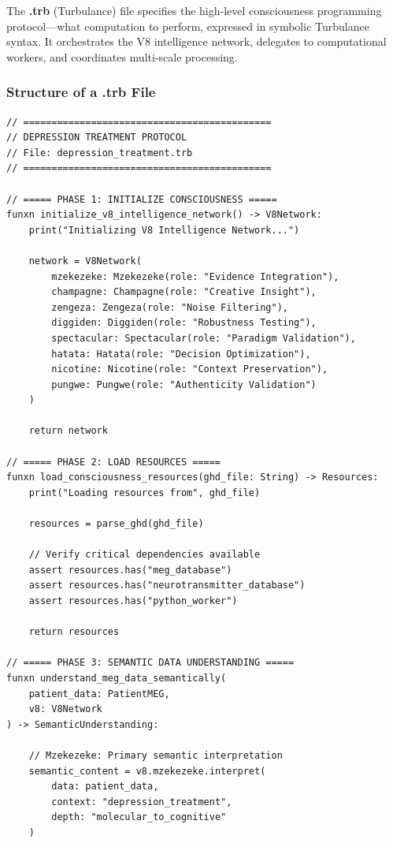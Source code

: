 \begin{definition}
The \textbf{.trb} (Turbulance) file specifies the high-level consciousness programming protocol—what computation to perform, expressed in symbolic Turbulance syntax. It orchestrates the V8 intelligence network, delegates to computational workers, and coordinates multi-scale processing.
\end{definition}

\subsubsection{Structure of a .trb File}

\begin{verbatim}
// ============================================
// DEPRESSION TREATMENT PROTOCOL
// File: depression_treatment.trb
// ============================================

// ===== PHASE 1: INITIALIZE CONSCIOUSNESS =====
funxn initialize_v8_intelligence_network() -> V8Network:
    print("Initializing V8 Intelligence Network...")
    
    network = V8Network(
        mzekezeke: Mzekezeke(role: "Evidence Integration"),
        champagne: Champagne(role: "Creative Insight"),
        zengeza: Zengeza(role: "Noise Filtering"),
        diggiden: Diggiden(role: "Robustness Testing"),
        spectacular: Spectacular(role: "Paradigm Validation"),
        hatata: Hatata(role: "Decision Optimization"),
        nicotine: Nicotine(role: "Context Preservation"),
        pungwe: Pungwe(role: "Authenticity Validation")
    )
    
    return network

// ===== PHASE 2: LOAD RESOURCES =====
funxn load_consciousness_resources(ghd_file: String) -> Resources:
    print("Loading resources from", ghd_file)
    
    resources = parse_ghd(ghd_file)
    
    // Verify critical dependencies available
    assert resources.has("meg_database")
    assert resources.has("neurotransmitter_database")
    assert resources.has("python_worker")
    
    return resources

// ===== PHASE 3: SEMANTIC DATA UNDERSTANDING =====
funxn understand_meg_data_semantically(
    patient_data: PatientMEG,
    v8: V8Network
) -> SemanticUnderstanding:
    
    // Mzekezeke: Primary semantic interpretation
    semantic_content = v8.mzekezeke.interpret(
        data: patient_data,
        context: "depression_treatment",
        depth: "molecular_to_cognitive"
    )
    

\end{verbatim}

